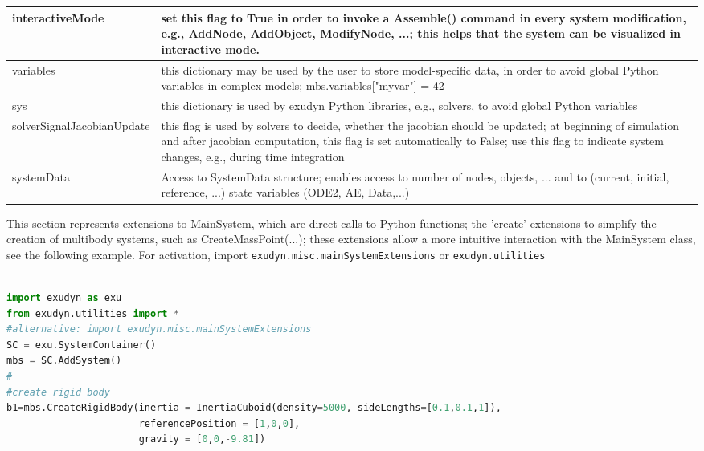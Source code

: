 \begin{center}
\begin{longtable}{| p{8cm} | p{8cm} |}
  interactiveMode & set this flag to True in order to invoke a Assemble() command in every system modification, e.g., AddNode, AddObject, ModifyNode, ...; this helps that the system can be visualized in interactive mode.\\ \hline  
  variables & this dictionary may be used by the user to store model-specific data, in order to avoid global Python variables in complex models; mbs.variables["myvar"] = 42 \\ \hline  
  sys & this dictionary is used by exudyn Python libraries, e.g., solvers, to avoid global Python variables \\ \hline  
  solverSignalJacobianUpdate & this flag is used by solvers to decide, whether the jacobian should be updated; at beginning of simulation and after jacobian computation, this flag is set automatically to False; use this flag to indicate system changes, e.g., during time integration  \\ \hline  
  systemData & Access to SystemData structure; enables access to number of nodes, objects, ... and to (current, initial, reference, ...) state variables (ODE2, AE, Data,...)\\ \hline  
\end{longtable}
\end{center}

\label{sec:mainsystem:pythonExtensionsCreate}
This section represents extensions to MainSystem, which are direct calls to Python functions; the 'create' extensions to simplify the creation of multibody systems, such as CreateMassPoint(...); these extensions allow a more intuitive interaction with the MainSystem class, see the following example. For activation, import \texttt{exudyn.misc.mainSystemExtensions} or \texttt{exudyn.utilities}

\pythonstyle
\begin{lstlisting}[language=Python, firstnumber=1]

import exudyn as exu           
from exudyn.utilities import * 
#alternative: import exudyn.misc.mainSystemExtensions
SC = exu.SystemContainer()
mbs = SC.AddSystem()
#
#create rigid body
b1=mbs.CreateRigidBody(inertia = InertiaCuboid(density=5000, sideLengths=[0.1,0.1,1]),
                       referencePosition = [1,0,0], 
                       gravity = [0,0,-9.81])
\end{lstlisting}




